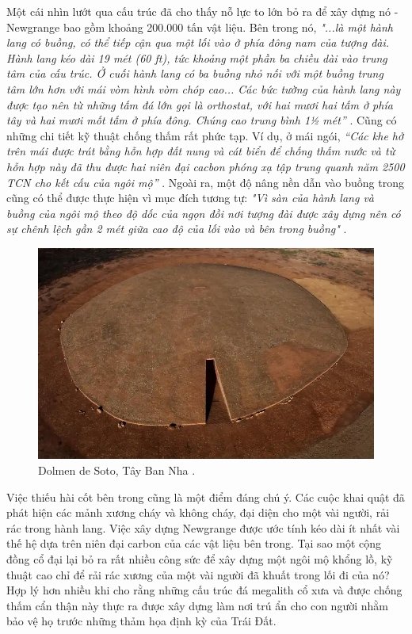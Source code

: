\documentclass[10pt,twocolumn,letterpaper]{article}
\begin{document}
Một cái nhìn lướt qua cấu trúc đã cho thấy nỗ lực to lớn bỏ ra để xây dựng nó - Newgrange bao gồm khoảng 200.000 tấn vật liệu. Bên trong nó, \textit{"...là một hành lang có buồng, có thể tiếp cận qua một lối vào ở phía đông nam của tượng đài. Hành lang kéo dài 19 mét (60 ft), tức khoảng một phần ba chiều dài vào trung tâm của cấu trúc. Ở cuối hành lang có ba buồng nhỏ nối với một buồng trung tâm lớn hơn với mái vòm hình vòm chóp cao... Các bức tường của hành lang này được tạo nên từ những tấm đá lớn gọi là orthostat, với hai mươi hai tấm ở phía tây và hai mươi mốt tấm ở phía đông. Chúng cao trung bình 1½ mét”} \cite{70}. Cũng có những chi tiết kỹ thuật chống thấm rất phức tạp. Ví dụ, ở mái ngói, \textit{“Các khe hở trên mái được trát bằng hỗn hợp đất nung và cát biển để chống thấm nước và từ hỗn hợp này đã thu được hai niên đại cacbon phóng xạ tập trung quanh năm 2500 TCN cho kết cấu của ngôi mộ”} \cite{71}. Ngoài ra, một độ nâng nền dẫn vào buồng trong cũng có thể được thực hiện vì mục đích tương tự: \textit{"Vì sàn của hành lang và buồng của ngôi mộ theo độ dốc của ngọn đồi nơi tượng đài được xây dựng nên có sự chênh lệch gần 2 mét giữa cao độ của lối vào và bên trong buồng"} \cite{71}.

\begin{figure}[b]
\begin{center}
   \includegraphics[width=1\linewidth]{dolmen.jpg}
\end{center}
   \caption{Dolmen de Soto, Tây Ban Nha \cite{53}.}
\label{fig:9}
\label{fig:onecol}

\end{figure}

Việc thiếu hài cốt bên trong cũng là một điểm đáng chú ý. Các cuộc khai quật đã phát hiện các mảnh xương cháy và không cháy, đại diện cho một vài người, rải rác trong hành lang. Việc xây dựng Newgrange được ước tính kéo dài ít nhất vài thế hệ dựa trên niên đại carbon của các vật liệu bên trong. Tại sao một cộng đồng cổ đại lại bỏ ra rất nhiều công sức để xây dựng một ngôi mộ khổng lồ, kỹ thuật cao chỉ để rải rác xương của một vài người đã khuất trong lối đi của nó? Hợp lý hơn nhiều khi cho rằng những cấu trúc đá megalith cổ xưa và được chống thấm cẩn thận này thực ra được xây dựng làm nơi trú ẩn cho con người nhằm bảo vệ họ trước những thảm họa định kỳ của Trái Đất.
\end{document}
